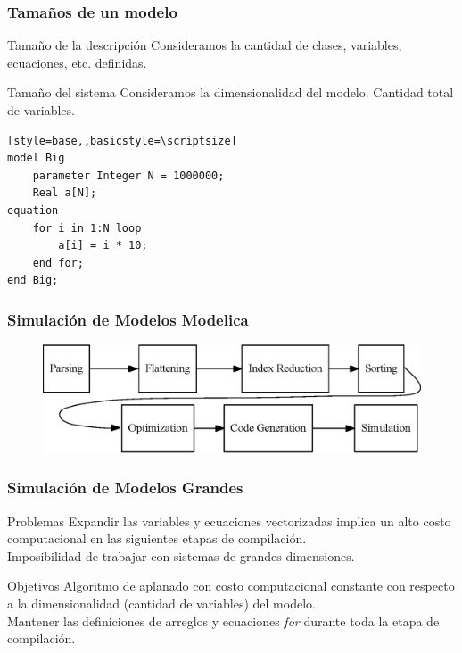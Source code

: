 \begin{frame}[fragile]
\frametitle{Tama\~nos de un modelo} 
\begin{block}{Tamaño de la descripción}
Consideramos la cantidad de clases, variables, ecuaciones, etc. definidas.
\end{block}
\begin{block}{Tamaño del sistema}
Consideramos la dimensionalidad del modelo. Cantidad total de variables. 
\end{block}
\pause
\begin{block}{}
\begin{lstlisting}[style=base,,basicstyle=\scriptsize]
model Big
    parameter Integer N = 1000000;
    Real a[N];
equation
    for i in 1:N loop
        a[i] = i * 10;
    end for;
end Big;
\end{lstlisting}
\end{block}
\end{frame}

\begin{frame}[fragile]
\frametitle{Simulación de Modelos Modelica} 
    \begin{figure}
      \centering
      \includegraphics[scale=0.8]{pipeline} 
      \label{fig:proceso}
    \end{figure}
\end{frame}



\begin{frame}[fragile]
\frametitle{Simulación de Modelos Grandes} 
\begin{block}{Problemas}
Expandir las variables y ecuaciones vectorizadas implica un alto costo computacional en las siguientes etapas de compilación. \\
Imposibilidad de trabajar con sistemas de grandes dimensiones.
\end{block} 
\pause
\begin{block}{Objetivos}
Algoritmo de aplanado con costo computacional constante con respecto a la dimensionalidad (cantidad de variables) del modelo. \\
Mantener las definiciones de arreglos y ecuaciones \textit{for} durante toda la etapa de compilación.
\end{block} 
\end{frame}
